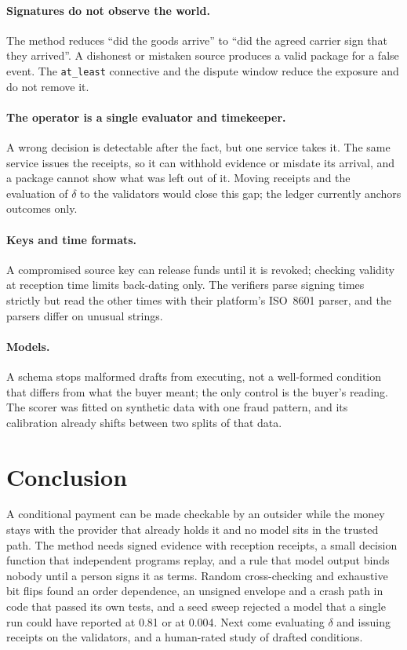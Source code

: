\documentclass[10pt,a4paper]{article}
\newcommand{\code}[1]{\texttt{\small #1}}
\theoremstyle{tight}
\begin{document}
\paragraph{Signatures do not observe the world.} The method reduces ``did the goods arrive'' to ``did the agreed
carrier sign that they arrived''. A dishonest or mistaken source produces a valid package for a false event. The
\code{at\_least} connective and the dispute window reduce the exposure and do not remove it.

\paragraph{The operator is a single evaluator and timekeeper.} A wrong decision is detectable after the fact, but
one service takes it. The same service issues the receipts, so it can withhold evidence or misdate its arrival, and
a package cannot show what was left out of it. Moving receipts and the evaluation of $\delta$ to the validators
would close this gap; the ledger currently anchors outcomes only.

\paragraph{Keys and time formats.} A compromised source key can release funds until it is revoked; checking
validity at reception time limits back-dating only. The verifiers parse signing times strictly but read the other
times with their platform's ISO~8601 parser, and the parsers differ on unusual strings.

\paragraph{Models.} A schema stops malformed drafts from executing, not a well-formed condition that differs from
what the buyer meant; the only control is the buyer's reading. The scorer was fitted on synthetic data with one fraud
pattern, and its calibration already shifts between two splits of that data.

\section{Conclusion}

A conditional payment can be made checkable by an outsider while the money stays with the provider that already
holds it and no model sits in the trusted path. The method needs signed evidence with reception receipts, a small
decision function that independent programs replay, and a rule that model output binds nobody until a person signs
it as terms. Random cross-checking and exhaustive bit flips found an order dependence, an unsigned envelope and a crash
path in code that passed its own tests, and a seed sweep rejected a model that a single run could have reported at
0.81 or at 0.004. Next come evaluating $\delta$ and issuing receipts on the validators, and a human-rated
study of drafted conditions.
\end{document}
